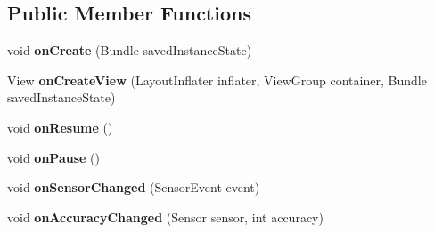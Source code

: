 \subsection*{Public Member Functions}
\begin{DoxyCompactItemize}
\item 
void {\bfseries on\+Create} (Bundle saved\+Instance\+State)\hypertarget{classcom_1_1example_1_1android_1_1wearable_1_1wcldemo_1_1SensorFragment_affa2193a68b749aa22176e445bac9d8f}{}\label{classcom_1_1example_1_1android_1_1wearable_1_1wcldemo_1_1SensorFragment_affa2193a68b749aa22176e445bac9d8f}

\item 
View {\bfseries on\+Create\+View} (Layout\+Inflater inflater, View\+Group container, Bundle saved\+Instance\+State)\hypertarget{classcom_1_1example_1_1android_1_1wearable_1_1wcldemo_1_1SensorFragment_ac12d5223603b272e91b903565c98f3f2}{}\label{classcom_1_1example_1_1android_1_1wearable_1_1wcldemo_1_1SensorFragment_ac12d5223603b272e91b903565c98f3f2}

\item 
void {\bfseries on\+Resume} ()\hypertarget{classcom_1_1example_1_1android_1_1wearable_1_1wcldemo_1_1SensorFragment_aa53ca3f775c74c5ccd1c99c6ecca0858}{}\label{classcom_1_1example_1_1android_1_1wearable_1_1wcldemo_1_1SensorFragment_aa53ca3f775c74c5ccd1c99c6ecca0858}

\item 
void {\bfseries on\+Pause} ()\hypertarget{classcom_1_1example_1_1android_1_1wearable_1_1wcldemo_1_1SensorFragment_ab7c57f9d0b2eba0be643161eaa6c9837}{}\label{classcom_1_1example_1_1android_1_1wearable_1_1wcldemo_1_1SensorFragment_ab7c57f9d0b2eba0be643161eaa6c9837}

\item 
void {\bfseries on\+Sensor\+Changed} (Sensor\+Event event)\hypertarget{classcom_1_1example_1_1android_1_1wearable_1_1wcldemo_1_1SensorFragment_a2b78935dbfb254d4165468feda4ec44d}{}\label{classcom_1_1example_1_1android_1_1wearable_1_1wcldemo_1_1SensorFragment_a2b78935dbfb254d4165468feda4ec44d}

\item 
void {\bfseries on\+Accuracy\+Changed} (Sensor sensor, int accuracy)\hypertarget{classcom_1_1example_1_1android_1_1wearable_1_1wcldemo_1_1SensorFragment_a312e22f63a424fcb284ee6c6fc4f35c1}{}\label{classcom_1_1example_1_1android_1_1wearable_1_1wcldemo_1_1SensorFragment_a312e22f63a424fcb284ee6c6fc4f35c1}

\end{DoxyCompactItemize}
